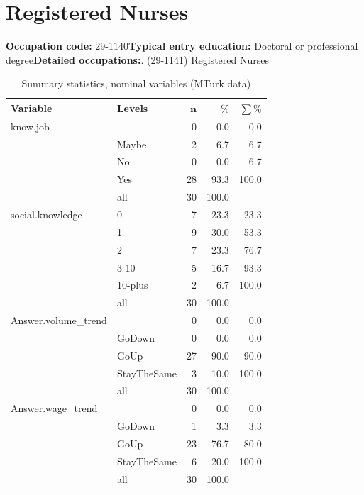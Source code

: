 \documentclass[a4paper,10pt]{article}\usepackage[]{graphicx}\usepackage[]{color}
\begin{document}
\newpage\section{Registered Nurses}\textbf{Occupation code:} 29-1140\newline\textbf{Typical entry education:} Doctoral or professional degree\newline\textbf{Detailed occupations:}. (29-1141)  \href{http://www.bls.gov/oes/current/oes291141.htm}{Registered Nurses}\newline%
\begin{table}[ht]
\centering
{\footnotesize
\begin{tabular}{ll|rrr}
 \textbf{Variable} & \textbf{Levels} & $\mathbf{n}$ & $\mathbf{\%}$ & $\mathbf{\sum \%}$ \\ 
  \hline
know.job &  & 0 & 0.0 & 0.0 \\ 
   & Maybe & 2 & 6.7 & 6.7 \\ 
   & No & 0 & 0.0 & 6.7 \\ 
   & Yes & 28 & 93.3 & 100.0 \\ 
   \hline
 & all & 30 & 100.0 &  \\ 
   \hline
\hline
social.knowledge & 0 & 7 & 23.3 & 23.3 \\ 
   & 1 & 9 & 30.0 & 53.3 \\ 
   & 2 & 7 & 23.3 & 76.7 \\ 
   & 3-10 & 5 & 16.7 & 93.3 \\ 
   & 10-plus & 2 & 6.7 & 100.0 \\ 
   \hline
 & all & 30 & 100.0 &  \\ 
   \hline
\hline
Answer.volume\_trend &  & 0 & 0.0 & 0.0 \\ 
   & GoDown & 0 & 0.0 & 0.0 \\ 
   & GoUp & 27 & 90.0 & 90.0 \\ 
   & StayTheSame & 3 & 10.0 & 100.0 \\ 
   \hline
 & all & 30 & 100.0 &  \\ 
   \hline
\hline
Answer.wage\_trend &  & 0 & 0.0 & 0.0 \\ 
   & GoDown & 1 & 3.3 & 3.3 \\ 
   & GoUp & 23 & 76.7 & 80.0 \\ 
   & StayTheSame & 6 & 20.0 & 100.0 \\ 
   \hline
 & all & 30 & 100.0 &  \\ 
   \hline
\hline
\end{tabular}
}
\caption{Summary statistics, nominal variables (MTurk data)} 
\label{tab1:29-1140}
\end{table}
\end{document}
